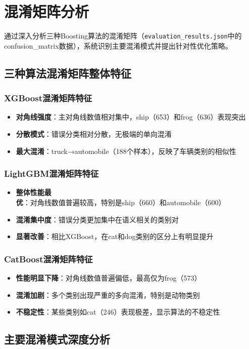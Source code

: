 \documentclass[UTF8]{report}
\theoremstyle{MyLineTheoremStyle} %
\theoremstyle{MyBlockTheoremStyle} %
\theoremstyle{MySubsubsectionStyle} %
\begin{document}
\section{混淆矩阵分析}
通过深入分析三种Boosting算法的混淆矩阵（\texttt{evaluation\_results.json}中的confusion\_matrix数据），系统识别主要混淆模式并提出针对性优化策略。

\subsection{三种算法混淆矩阵整体特征}
\subsubsection{XGBoost混淆矩阵特征}
\begin{itemize}
    \item \textbf{对角线强度}：主对角线数值相对集中，ship（653）和frog（636）表现突出
    \item \textbf{分散模式}：错误分类相对分散，无极端的单向混淆
    \item \textbf{最大混淆}：truck→automobile（188个样本），反映了车辆类别的相似性
\end{itemize}
\subsubsection{LightGBM混淆矩阵特征}
\begin{itemize}
    \item \textbf{整体性能最优}：对角线数值普遍较高，特别是ship（660）和automobile（600）
    \item \textbf{混淆集中度}：错误分类更加集中在语义相关的类别对
    \item \textbf{显著改善}：相比XGBoost，在cat和dog类别的区分上有明显提升
\end{itemize}
\subsubsection{CatBoost混淆矩阵特征}
\begin{itemize}
    \item \textbf{性能明显下降}：对角线数值普遍偏低，最高仅为frog（573）
    \item \textbf{混淆加剧}：多个类别出现严重的多向混淆，特别是动物类别
    \item \textbf{不稳定性}：某些类别如cat（246）表现极差，显示算法的不稳定性
\end{itemize}

\subsection{主要混淆模式深度分析}
\end{document}
